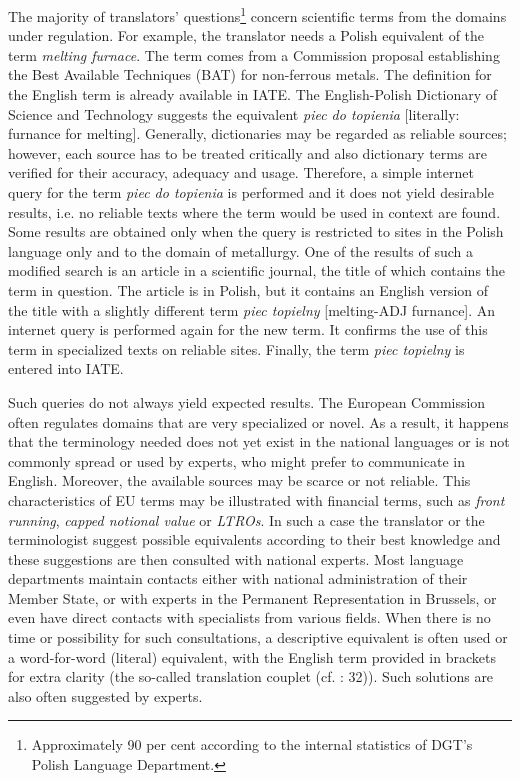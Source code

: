 \documentclass[output=paper]{langsci/langscibook}
\begin{document}
The majority of translators’ questions\footnote{Approximately 90 per cent according to the internal statistics of DGT’s Polish Language Department.} concern scientific terms from the domains under regulation. For example, the translator needs a Polish equivalent of the term \textit{melting furnace}. The term comes from a Commission proposal establishing the Best Available Techniques (BAT) for non-ferrous metals. The definition for the English term is already available in IATE. The English-Polish Dictionary of Science and Technology \citep[692]{Berger2004} suggests the equivalent \textit{piec do topienia} [literally: furnance for melting]. Generally, dictionaries may be regarded as reliable sources; however, each source has to be treated critically and also dictionary terms are verified for their accuracy, adequacy and usage. Therefore, a simple internet query for the term \textit{piec do topienia} is performed and it does not yield desirable results, i.e. no reliable texts where the term would be used in context are found. Some results are obtained only when the query is restricted to sites in the Polish language only and to the domain of metallurgy. One of the results of such a modified search is an article in a scientific journal, the title of which contains the term in question. The article is in Polish, but it contains an English version of the title with a slightly different term \textit{piec topielny} [melting-ADJ furnance]. An internet query is performed again for the new term. It confirms the use of this term in specialized texts on reliable sites. Finally, the term \textit{piec topielny} is entered into IATE.

Such queries do not always yield expected results. The European Commission often regulates domains that are very specialized or novel. As a result, it happens that the terminology needed does not yet exist in the national languages or is not commonly spread or used by experts, who might prefer to communicate in English. Moreover, the available sources may be scarce or not reliable. This characteristics of EU terms may be illustrated with financial terms, such as \textit{front running}, \textit{capped notional value} or \textit{LTROs}. In such a case the translator or the terminologist suggest possible equivalents according to their best knowledge and these suggestions are then consulted with national experts. Most language departments maintain contacts either with national administration of their Member State, or with experts in the Permanent Representation in Brussels, or even have direct contacts with specialists from various fields. When there is no time or possibility for such consultations, a descriptive equivalent is often used or a word-for-word (literal) equivalent, with the English term provided in brackets for extra clarity (the so-called translation couplet (cf. \citealt{Newmark1981}: 32)). Such solutions are also often suggested by experts.
\end{document}
